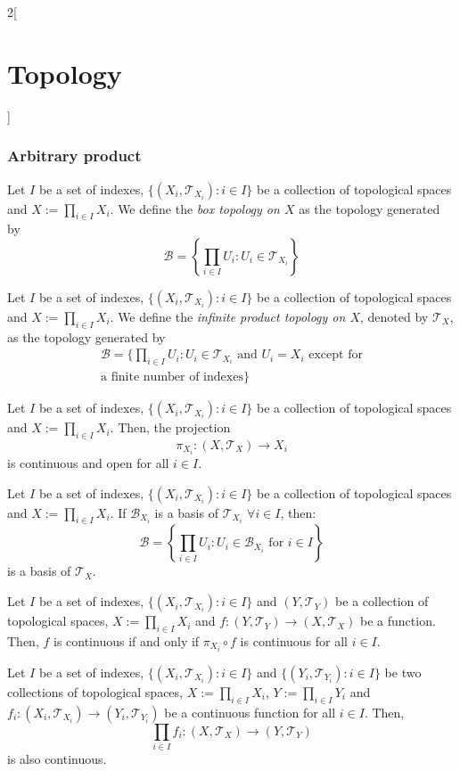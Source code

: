 \documentclass[../../../main.tex]{subfiles}
\begin{document}
\begin{multicols}{2}[\section{Topology}]
  \subsubsection{Arbitrary product}
  \begin{definition}
    Let $I$ be a set of indexes, $\{(X_i,\mathcal{T}_{X_i}):i\in I\}$ be a collection of topological spaces and $X:=\prod_{i\in I}X_i$. We define the \textit{box topology on $X$} as the topology generated by $$\mathcal{B}=\left\{\prod_{i\in I}U_i:U_i\in\mathcal{T}_{X_i}\right\}$$
  \end{definition}
  \begin{definition}
    Let $I$ be a set of indexes, $\{(X_i,\mathcal{T}_{X_i}):i\in I\}$ be a collection of topological spaces and $X:=\prod_{i\in I}X_i$. We define the \textit{infinite product topology on $X$}, denoted by $\mathcal{T}_X$, as the topology generated by
    \begin{multline*}
      \mathcal{B}=\Bigg\{\prod_{i\in I}U_i:U_i\in\mathcal{T}_{X_i}\text{ and $U_i=X_i$ except for}\\\text{a finite number of indexes}\Bigg\}
    \end{multline*}
  \end{definition}
  \begin{prop}
    Let $I$ be a set of indexes, $\{(X_i,\mathcal{T}_{X_i}):i\in I\}$ be a collection of topological spaces and $X:=\prod_{i\in I}X_i$. Then, the projection $$\pi_{X_i}:\left(X,\mathcal{T}_X\right)\longrightarrow X_i$$
    is continuous and open for all $i\in I$.
  \end{prop}
  \begin{prop}
    Let $I$ be a set of indexes, $\{(X_i,\mathcal{T}_{X_i}):i\in I\}$ be a collection of topological spaces and $X:=\prod_{i\in I}X_i$. If $\mathcal{B}_{X_i}$ is a basis of $\mathcal{T}_{X_i}$ $\forall i\in I$, then: $$\mathcal{B}=\left\{\prod_{i\in I}U_i:U_i\in\mathcal{B}_{X_i}\text{ for }i\in I\right\}$$
    is a basis of $\mathcal{T}_X$.
  \end{prop}
  \begin{prop}
    Let $I$ be a set of indexes, $\{(X_i,\mathcal{T}_{X_i}):i\in I\}$ and $(Y,\mathcal{T}_Y)$ be a collection of topological spaces, $X:=\prod_{i\in I}X_i$ and $f:(Y,\mathcal{T}_Y)\rightarrow(X,\mathcal{T}_X)$ be a function. Then, $f$ is continuous if and only if $\pi_{X_i}\circ f$ is continuous for all $i\in I$.
  \end{prop}
  \begin{prop}
    Let $I$ be a set of indexes, $\{(X_i,\mathcal{T}_{X_i}):i\in I\}$ and $\{(Y_i,\mathcal{T}_{Y_i}):i\in I\}$ be two collections of topological spaces, $X:=\prod_{i\in I}X_i$, $Y:=\prod_{i\in I}Y_i$ and $f_i:(X_i,\mathcal{T}_{X_i})\rightarrow(Y_i,\mathcal{T}_{Y_i})$ be a continuous function for all $i\in I$. Then, $$\prod_{i\in I}f_i:\left(X,\mathcal{T}_X\right)\longrightarrow\left(Y,\mathcal{T}_Y\right)$$ is also continuous.
  \end{prop}
\end{multicols}
\end{document}

